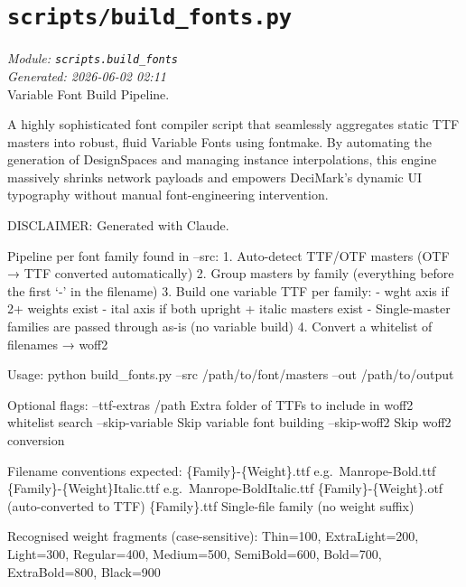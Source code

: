 
\section{\texttt{scripts/build\_fonts.py}}
\textit{Module: \texttt{scripts.build\_fonts}} \\
\textit{Generated: 2026-06-02 02:11} \\

Variable Font Build Pipeline.

A highly sophisticated font compiler script that seamlessly aggregates
static TTF masters into robust, fluid Variable Fonts using fontmake. By
automating the generation of DesignSpaces and managing instance
interpolations, this engine massively shrinks network payloads and
empowers DeciMark's dynamic UI typography without manual
font-engineering intervention.

DISCLAIMER: Generated with Claude.

Pipeline per font family found in --src: 1. Auto-detect TTF/OTF masters
(OTF → TTF converted automatically) 2. Group masters by family
(everything before the first `-' in the filename) 3. Build one variable
TTF per family: - wght axis if 2+ weights exist - ital axis if both
upright + italic masters exist - Single-master families are passed
through as-is (no variable build) 4. Convert a whitelist of filenames →
woff2

Usage: python build\_fonts.py --src /path/to/font/masters --out
/path/to/output

Optional flags: --ttf-extras /path Extra folder of TTFs to include in
woff2 whitelist search --skip-variable Skip variable font building
--skip-woff2 Skip woff2 conversion

Filename conventions expected: \{Family\}-\{Weight\}.ttf
e.g.~Manrope-Bold.ttf \{Family\}-\{Weight\}Italic.ttf
e.g.~Manrope-BoldItalic.ttf \{Family\}-\{Weight\}.otf (auto-converted to
TTF) \{Family\}.ttf Single-file family (no weight suffix)

Recognised weight fragments (case-sensitive): Thin=100, ExtraLight=200,
Light=300, Regular=400, Medium=500, SemiBold=600, Bold=700,
ExtraBold=800, Black=900
